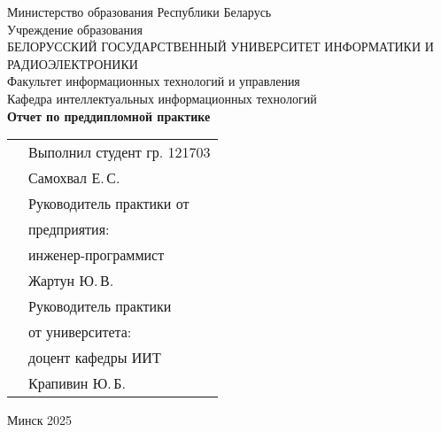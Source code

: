 \begin{titlepage}
    
    \begin{center}
        Министерство образования Республики Беларусь \\[0.4cm] 

        Учреждение образования \\

        \MakeUppercase{БЕЛОРУССКИЙ ГОСУДАРСТВЕННЫЙ УНИВЕРСИТЕТ ИНФОРМАТИКИ И РАДИОЭЛЕКТРОНИКИ} \\[0.4cm]

        Факультет информационных технологий и управления \\[0.4cm]

        Кафедра интеллектуальных информационных технологий \\[3.4cm] %

        {\large\bfseries{Отчет по преддипломной практике}} \\[2cm]

        \noindent
        \begin{tabular}{p{}p{}}
            & Выполнил студент гр. 121703 \\
            & Самохвал Е.\,С. \\[1cm]

            & Руководитель практики от \\
            & предприятия: \\
            & инженер-программист \\
            & Жартун Ю.\,В. \\[1cm]

            & Руководитель практики \\
            & от университета: \\
            & доцент кафедры ИИТ  \\
            & Крапивин Ю.\,Б. \\
        \end{tabular}

        \vfill

        {\normalsize Минск 2025}
    \end{center}

\end{titlepage}
